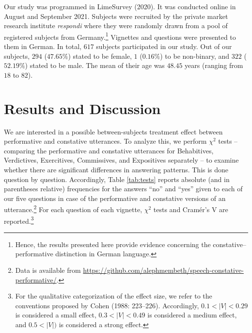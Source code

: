 \documentclass[egregdoesnotlikesansseriftitles,12pt]{scrartcl}
\begin{document}
Our study was programmed in LimeSurvey (2020). It was conducted online in August and September 2021. Subjects were recruited by the private market research institute \textit{respondi} where they were randomly drawn from a pool of registered subjects from Germany.\footnote{Hence, the results presented here provide evidence concerning the constative--performative distinction in German language.} Vignettes and questions were presented to them in German. In total, $617$ subjects participated in our study. Out of our subjects, $294$ ($47.65\%$) stated to be female, $1$ ($0.16\%$) to be non-binary, and $322$ ($52.19\%$) stated to be male. The mean of their age was $48.45$ years (ranging from $18$ to $82$).


\section{Results and Discussion}\label{sec:results}
We are interested in a possible between-subjects treatment effect between performative and constative utterances. To analyze this, we perform $\chi^2$ tests -- comparing the performative and constative utterances for Behabitives, Verdictives, Exercitives, Commissives, and Expositives separately -- to examine whether there are significant differences in answering patterns. This is done question by question. Accordingly, Table \ref{tab:tests} reports absolute (and in parentheses relative) frequencies for the answers ``no'' and ``yes'' given to each of our five questions in case of the performative and constative versions of an utterance.\footnote{Data is available from \href{https://github.com/alephmembeth/speech-constative-performative/}{https://github.com/alephmembeth/speech-constative-performative/}.} For each question of each vignette, $\chi^2$ tests and Cramér's V are reported.\footnote{For the qualitative categorization of the effect size, we refer to the conventions proposed by Cohen (1988: 223--226). Accordingly, $0.1<|V|<0.29$ is considered a small effect, $0.3<|V|<0.49$ is considered a medium effect, and $0.5<|V|)$ is considered a strong effect.}
\end{document}

